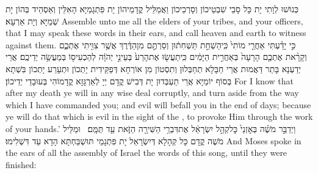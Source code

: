 {כְּנוּשׁוּ לְוָתִי יָת כָּל סָבֵי שִׁבְטֵיכוֹן וְסָרְכֵיכוֹן וַאֲמַלֵּיל קֳדָמֵיהוֹן יָת פִּתְגָמַיָּא הָאִלֵּין וְאַסְהֵיד בְּהוֹן יָת שְׁמַיָּא וְיָת אַרְעָא׃}
{Assemble unto me all the elders of your tribes, and your officers, that I may speak these words in their ears, and call heaven and earth to witness against them.}{}
{כִּ֣י יָדַ֗עְתִּי אַחֲרֵ֤י מוֹתִי֙ כִּֽי\maqqaf הַשְׁחֵ֣ת תַּשְׁחִת֔וּן וְסַרְתֶּ֣ם מִן\maqqaf הַדֶּ֔רֶךְ אֲשֶׁ֥ר צִוִּ֖יתִי אֶתְכֶ֑ם וְקָרָ֨את אֶתְכֶ֤ם הָרָעָה֙ בְּאַחֲרִ֣ית הַיָּמִ֔ים כִּֽי\maqqaf תַעֲשׂ֤וּ אֶת\maqqaf הָרַע֙ בְּעֵינֵ֣י יְהֹוָ֔ה לְהַכְעִיס֖וֹ בְּמַעֲשֵׂ֥ה יְדֵיכֶֽם׃}
{אֲרֵי יְדַעְנָא בָּתַר דַּאֲמוּת אֲרֵי חַבָּלָא תְחַבְּלוּן וְתִסְטוֹן מִן אוֹרְחָא דְּפַקֵּידִית יָתְכוֹן וּתְעָרַע יָתְכוֹן בִּשְׁתָא בְּסוֹף יוֹמַיָּא אֲרֵי תַעְבְּדוּן יָת דְּבִישׁ קֳדָם יְיָ לְאַרְגָּזָא קֳדָמוֹהִי בְּעוּבָדֵי יְדֵיכוֹן׃}
{For I know that after my death ye will in any wise deal corruptly, and turn aside from the way which I have commanded you; and evil will befall you in the end of days; because ye will do that which is evil in the sight of the \lord, to provoke Him through the work of your hands.’}{}
{וַיְדַבֵּ֣ר מֹשֶׁ֗ה בְּאׇזְנֵי֙ כׇּל\maqqaf קְהַ֣ל יִשְׂרָאֵ֔ל אֶת\maqqaf דִּבְרֵ֥י הַשִּׁירָ֖ה הַזֹּ֑את עַ֖ד תֻּמָּֽם׃ \petucha }
{וּמַלֵּיל מֹשֶׁה קֳדָם כָּל קְהָלָא דְּיִשְׂרָאֵל יָת פִּתְגָמֵי תּוּשְׁבַּחְתָּא הָדָא עַד דִּשְׁלִימוּ׃}
{And Moses spoke in the ears of all the assembly of Israel the words of this song, until they were finished:}{}


